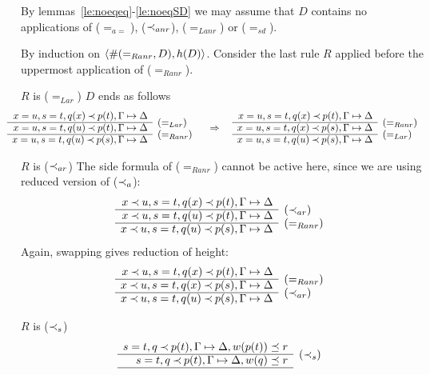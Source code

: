 \begin{PROOF}
By lemmas~\ref{le:noeqeq}-\ref{le:noeqSD} we may assume that $D$ contains no
applications of ($=_{a=}$), ($\mathbin{\prec}_{anr}$), ($=_{Lanr}$) or ($=_{sd}$).

By induction on $\langle\#(=_{Ranr},D),h(D)\rangle$. Consider the last rule
 $R$ applied before the uppermost application of ($=_{Ranr}$).
\begin{LS}
\item $R$ is ($=_{Lar}$) $D$ ends as follows
\[ \hspace*{-1.5em}  \begin{array}{rl} 
x=u, s=t, q(x)\Incl p(t), \GSD \\ \cline{1-1}
x=u, s=t, q(u)\Incl p(t), \GSD & \rabove{(=_{Lar})} \\ \cline{1-1}
x=u, s=t, q(u)\Incl p(s), \GSD & \rabove{(=_{Ranr})} \end{array} \conv
\begin{array}{rl}
x=u, s=t, q(x)\Incl p(t), \GSD \\ \cline{1-1}
x=u, s=t, q(x)\Incl p(s), \GSD & \rabove{(=_{Ranr})} \\ \cline{1-1}
x=u, s=t, q(u)\Incl p(s), \GSD & \rabove{(=_{Lar})} \end{array} \]
%
\item $R$ is ($\mathbin{\prec}_{ar}$) The side formula of ($=_{Ranr}$) cannot be active
here, since we are using reduced version of ($\mathbin{\prec}_a$):
\[ \begin{array}{rl}
x\Incl u, s=t, q(x)\Incl p(t), \GSD \\ \cline{1-1}
x\Incl u, s=t, q(u)\Incl p(t), \GSD & \rabove{(\Incl_{ar})} \\ \cline{1-1}
x\Incl u, s=t, q(u)\Incl p(s), \GSD & \rabove{(=_{Ranr})} \end{array} \]
Again, swapping gives reduction of height:
\[ \begin{array}{rl}
x\Incl u, s=t, q(x)\Incl p(t), \GSD \\ \cline{1-1}
x\Incl u, s=t, q(x)\Incl p(s), \GSD & \rabove{(=_{Ranr})} \\ \cline{1-1}
x\Incl u, s=t, q(u)\Incl p(s), \GSD & \rabove{(\Incl_{ar})} \end{array} \]
%
\item $R$ is ($\mathbin{\prec}_{s}$)
\[ \begin{array}{rl}
s=t, q\Incl p(t), \GSD, w(p(t))\preceq r \\ \cline{1-1}
s=t, q\Incl p(t), \GSD, w(q)\preceq r & \rabove{(\Incl_s)} \\ \cline{1-1}

\end{array}\]
\end{LS}
\end{PROOF}

